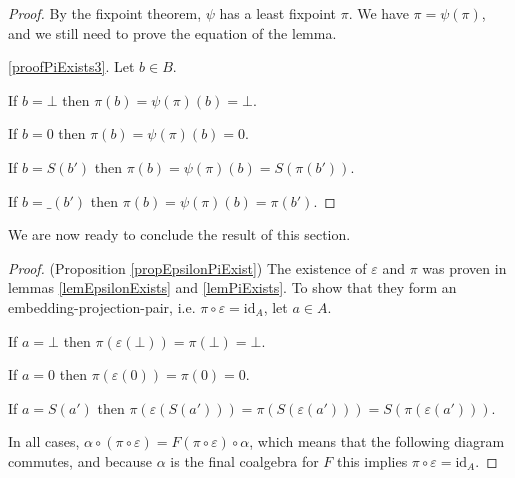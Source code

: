 \documentclass[a4paper]{article}
\begin{document}
\begin{proof}
By the fixpoint theorem, $\psi$ has a least fixpoint $\pi$. We have $\pi =
\psi(\pi)$, and we still need to prove the equation of the lemma.

\ref{proofPiExists3}. Let $b \in B$.

If $b = \bot$ then $\pi(b) = \psi(\pi)(b) = \bot$.

If $b = 0$ then $\pi(b) = \psi(\pi)(b) = 0$.

If $b = S(b')$ then $\pi(b) = \psi(\pi)(b) = S(\pi(b'))$.

If $b = \_(b')$ then $\pi(b) = \psi(\pi)(b) = \pi(b')$.
\end{proof}

We are now ready to conclude the result of this section.

\begin{proof}
(Proposition \ref{propEpsilonPiExist}) The existence of $\varepsilon$ and $\pi$
was proven in lemmas \ref{lemEpsilonExists} and \ref{lemPiExists}. To show that
they form an embedding-projection-pair, i.e. $\pi \circ \varepsilon =
\text{id}_A$, let $a \in A$.

If $a = \bot$ then $\pi(\varepsilon(\bot)) = \pi(\bot) = \bot$.

If $a = 0$ then $\pi(\varepsilon(0)) = \pi(0) = 0$.

If $a = S(a')$ then $\pi(\varepsilon(S(a'))) = \pi(S(\varepsilon(a'))) =
S(\pi(\varepsilon(a')))$.

In all cases, $\alpha \circ (\pi \circ \varepsilon) = F(\pi \circ \varepsilon)
\circ \alpha$, which means that the following diagram commutes, and because
$\alpha$ is the final coalgebra for $F$ this implies $\pi \circ \varepsilon =
\text{id}_A$.
\end{proof}
\begin{figure}[h]
\begin{center}
\end{center}
\end{figure}
\end{document}
